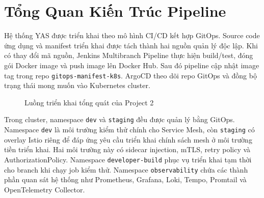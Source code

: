 \section{Tổng Quan Kiến Trúc Pipeline}

Hệ thống YAS được triển khai theo mô hình CI/CD kết hợp GitOps. Source code ứng dụng và manifest triển khai được tách thành hai nguồn quản lý độc lập. Khi có thay đổi mã nguồn, Jenkins Multibranch Pipeline thực hiện build/test, đóng gói Docker image và push image lên Docker Hub. Sau đó pipeline cập nhật image tag trong repo \texttt{gitops-manifest-k8s}. ArgoCD theo dõi repo GitOps và đồng bộ trạng thái mong muốn vào Kubernetes cluster.

\begin{figure}[H]
\centering
{}
\caption{Luồng triển khai tổng quát của Project 2}
\end{figure}

Trong cluster, namespace \texttt{dev} và \texttt{staging} đều được quản lý bằng GitOps. Namespace \texttt{dev} là môi trường kiểm thử chính cho Service Mesh, còn \texttt{staging} có overlay Istio riêng để đáp ứng yêu cầu triển khai chính sách mesh ở môi trường tiền triển khai. Hai môi trường này có sidecar injection, mTLS, retry policy và AuthorizationPolicy. Namespace \texttt{developer-build} phục vụ triển khai tạm thời cho branch khi chạy job kiểm thử. Namespace \texttt{observability} chứa các thành phần quan sát hệ thống như Prometheus, Grafana, Loki, Tempo, Promtail và OpenTelemetry Collector.
